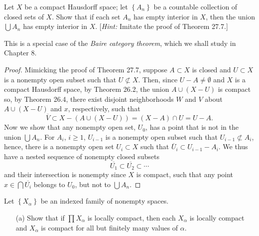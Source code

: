 \newpage
\begin{problem}[Munkres \S27, Ex.\,5]
Let $X$ be a compact Hausdorff space; let $\left\{A_n\right\}$ be
a countable collection of closed sets of $X$. Show that if each
set $A_n$ has empty interior in $X$, then the union $\bigcup A_n$
has empty interior in $X$. [\emph{Hint:} Imitate the proof of
Theorem 27.7.]

This is a special case of the \emph{Baire category theorem},
which we shall study in Chapter 8.
\end{problem}
\begin{proof}
Mimicking the proof of Theorem 27.7, suppose $A\subset X$ is
closed and $U\subset X$ is a nonempty open subset such that
$U\nsubset X$. Then, since $U-A\neq\emptyset$ and $X$ is a
compact Hausdorff space, by Theorem 26.2, the union $A\cup (X-U)$
is compact so, by Theorem 26.4, there exist disjoint
neighborhoods $W$ and $V$ about $A\cup(X-U)$ and $x$,
respectively, such that
\[\overline V\subset X-(A\cup(X-U))=(X-A)\cap U=U-A.\]
Now we show that any nonempty open set, $U_0$, has a point that
is not in the union $\bigcup A_n$. For $A_i$, $i\geq 1$,
$U_{i-1}$ is a nonempty open subset such that $U_{i-1}\nsubset
A_i$, hence, there is a nonempty open set $U_i\subset X$ such
that $\overline U_i\subset U_{i-1}-A_i$. We thus have a nested
sequence of nonempty closed subsets
\[
\overline{U_1}\subset\overline{U_2}\subset\cdots
\]
and their intersection is nonempty since $X$ is compact, such
that any point $x\in\bigcap\overline{U_i}$ belongs to $U_0$, but
not to $\bigcup A_n$.
\end{proof}
\newpage
\begin{problem}[Munkres \S29, Ex.\,2(a)]
Let $\left\{X_\alpha\right\}$ be an indexed family of nonempty
spaces.
\begin{itemize}
\item[(a)] Show that if $\prod X_\alpha$ is locally compact, then
  each $X_\alpha$ is locally compact and $X_\alpha$ is compact
  for all but finitely many values of $\alpha$.
\end{itemize}
\end{problem}
